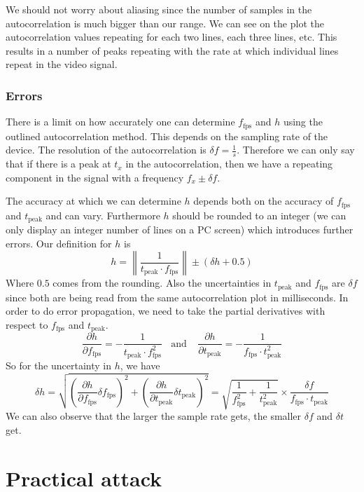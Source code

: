 \documentclass[a4paper,12pt,twoside,openright]{report}
\begin{document}
We should not worry about aliasing since the number of samples in the autocorrelation is much bigger than our range. We can see on the plot the autocorrelation values repeating for each two lines, each three lines, etc. This results in a number of peaks repeating with the rate at which individual lines repeat in the video signal.

\subsection{Errors}

There is a limit on how accurately one can determine $f_\text{fps}$ and $h$ using the outlined autocorrelation method. This depends on the sampling rate of the device. The resolution of the autocorrelation is $\delta f = \frac{1}{s}$. Therefore we can only say that if there is a peak at $t_{x}$ in the autocorrelation, then we have a repeating component in the signal with a frequency $f_{x} \pm \delta f$.

The accuracy at which we can determine $h$ depends both on the accuracy of $f_\text{fps}$ and $t_\text{peak}$ and can vary. Furthermore $h$ should be rounded to an integer (we can only display an integer number of lines on a PC screen) which introduces further errors. Our definition for $h$ is
$$h = \left\| \frac{1}{t_\text{peak} \cdot f_\text{fps}} \right\| \pm (\delta h + 0.5)$$
Where $0.5$ comes from the rounding. Also the uncertainties in $t_\text{peak}$ and $f_\text{fps}$ are $\delta f$ since both are being read from the same autocorrelation plot in milliseconds. In order to do error propagation, we need to take the partial derivatives with respect to $f_\text{fps}$ and $t_\text{peak}$.
$$\frac{\partial h}{\partial f_\text{fps}} = - \frac{1}{t_\text{peak} \cdot f_\text{fps}^2}
 \,\,\,\,\ \text{and} \,\,\,\,\ \
\frac{\partial h}{\partial t_\text{peak}} = - \frac{1}{f_\text{fps} \cdot t_\text{peak}^2}$$
So for the uncertainty in $h$, we have
$$\delta h =
\sqrt{\left( \frac{\partial h}{\partial f_\text{fps}} \delta f_\text{fps} \right)^2 + \left( \frac{\partial h}{\partial t_\text{peak}} \delta t_\text{peak} \right)^2} = 
\sqrt{\frac{1}{f_\text{fps}^2} + \frac{1}{t_\text{peak}^2}} \times \frac{\delta f}{f_\text{fps} \cdot t_\text{peak}}$$
We can also observe that the larger the sample rate gets, the smaller $\delta f$ and $\delta t$ get.

\chapter{Practical attack} 
\end{document}
